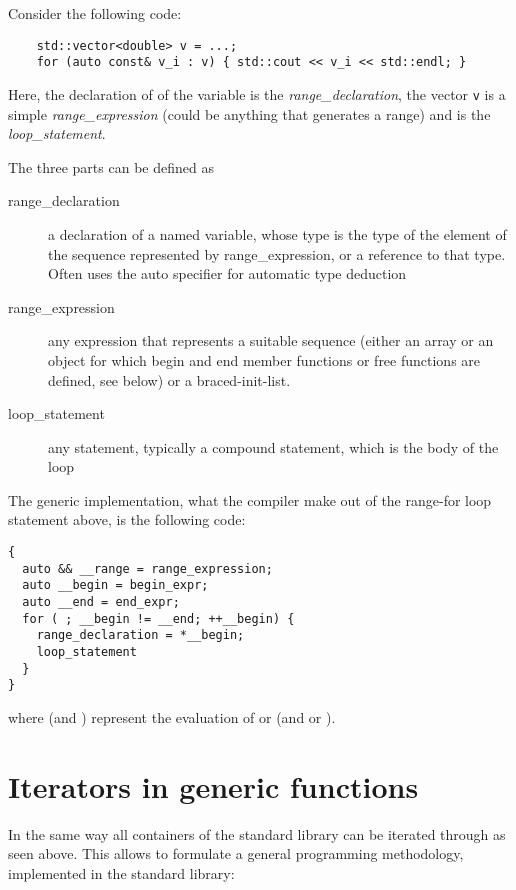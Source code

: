 \begin{example}
  Consider the following code:
  \begin{verbatim}
    std::vector<double> v = ...;
    for (auto const& v_i : v) { std::cout << v_i << std::endl; }
  \end{verbatim}

  Here, the declaration of of the variable  is the \emph{range\_declaration}, the vector \texttt{v} is a simple
  \emph{range\_expression} (could be anything that generates a range) and  is the \emph{loop\_statement}.
\end{example}

The three parts can be defined as
\begin{description}
  \item[range\_declaration]
    a declaration of a named variable, whose type is the type of the element of the sequence represented by range\_expression, or a reference
    to that type. Often uses the auto specifier for automatic type deduction
  \item[range\_expression]
    any expression that represents a suitable sequence (either an array or an object for which begin and end member functions or free functions
    are defined, see below) or a braced-init-list.
  \item[loop\_statement]
    any statement, typically a compound statement, which is the body of the loop
\end{description}

The generic implementation, \ie what the compiler make out of the range-for loop statement above, is the following code:
%
\begin{verbatim}
{
  auto && __range = range_expression;
  auto __begin = begin_expr;
  auto __end = end_expr;
  for ( ; __begin != __end; ++__begin) {
    range_declaration = *__begin;
    loop_statement
  }
}
\end{verbatim}
where  (and ) represent the evaluation of  or  (and  or ).


\section{Iterators in generic functions}
In the same way all containers of the standard library can be iterated through as seen above.
This allows to formulate a general programming methodology, implemented in the standard library:

